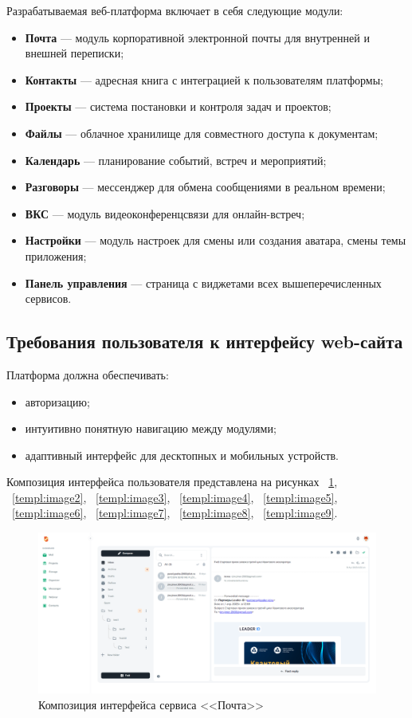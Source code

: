 Разрабатываемая веб-платформа включает в себя следующие модули:
\begin{itemize}
\item \textbf{Почта} — модуль корпоративной электронной почты для внутренней и внешней переписки;
\item \textbf{Контакты} — адресная книга с интеграцией к пользователям платформы;
\item \textbf{Проекты} — система постановки и контроля задач и проектов;
\item \textbf{Файлы} — облачное хранилище для совместного доступа к документам;
\item \textbf{Календарь} — планирование событий, встреч и мероприятий;
\item \textbf{Разговоры} — мессенджер для обмена сообщениями в реальном времени;
\item \textbf{ВКС} — модуль видеоконференцсвязи для онлайн-встреч;
\item \textbf{Настройки} — модуль настроек для смены или создания аватара, смены темы приложения;
\item \textbf{Панель управления} — страница с виджетами всех вышеперечисленных сервисов.
\end{itemize}

\subsection{Требования пользователя к интерфейсу web-сайта}

Платформа должна обеспечивать:
\begin{itemize}
    \item авторизацию;
    \item интуитивно понятную навигацию между модулями;
    \item адаптивный интерфейс для десктопных и мобильных устройств.
\end{itemize}

Композиция интерфейса пользователя представлена на рисунках ~\ref{templ:image1}, ~\ref{templ:image2}, ~\ref{templ:image3}, ~\ref{templ:image4}, ~\ref{templ:image5}, ~\ref{templ:image6}, ~\ref{templ:image7}, ~\ref{templ:image8}, ~\ref{templ:image9}.

\begin{figure}[ht]
	\centering
	\includegraphics[width=1\linewidth]{images/почта}
	\caption{Композиция интерфейса сервиса <<Почта>>}
	\label{templ:image1}
\end{figure}

